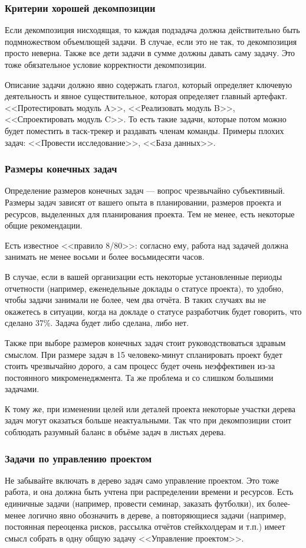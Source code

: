 \documentclass{../../text-style}
\begin{document}
\subsubsection{Критерии хорошей декомпозиции}

Если декомпозиция нисходящая, то каждая подзадача должна действительно быть подмножеством объемлющей задачи. В случае, если это не так, то декомпозиция просто неверна. Также все дети задачи в сумме должны давать саму задачу. Это тоже обязательное условие корректности декомпозиции.

Описание задачи должно явно содержать глагол, который определяет ключевую деятельность и явное существительное, которая определяет главный артефакт. <<Протестировать модуль A>>, <<Реализовать модуль B>>, <<Спроектировать модуль C>>. То есть такие задачи, которые потом можно будет поместить в таск-трекер и раздавать членам команды. Примеры плохих задач: <<Провести исследование>>, <<База данных>>.

\subsubsection{Размеры конечных задач}

Определение размеров конечных задач --- вопрос чрезвычайно субъективный. Размеры задач зависят от вашего опыта в планировании, размеров проекта и ресурсов, выделенных для планирования проекта. Тем не менее, есть некоторые общие рекомендации.

Есть известное <<правило 8/80>>: согласно ему, работа над задачей должна занимать не менее восьми и более восьмидесяти часов.

В случае, если в вашей организации есть некоторые установленные периоды отчетности (например, еженедельные доклады о статусе проекта), то удобно, чтобы задачи занимали не более, чем два отчёта. В таких случаях вы не окажетесь в ситуации, когда на докладе о статусе разработчик будет говорить, что сделано 37\%. Задача будет либо сделана, либо нет.

Также при выборе размеров конечных задач стоит руководствоваться здравым смыслом. При размере задач в 15 человеко-минут спланировать проект будет стоить чрезвычайно дорого, а сам процесс будет очень неэффективен из-за постоянного микроменеджмента. Та же проблема и со слишком большими задачами.

К тому же, при изменении целей или деталей проекта некоторые участки дерева задач могут оказаться больше неактуальными. Так что при декомпозиции стоит соблюдать разумный баланс в объёме задач в листьях дерева.

\subsubsection{Задачи по управлению проектом}

Не забывайте включать в дерево задач само управление проектом. Это тоже работа, и она должна быть учтена при распределении времени и ресурсов. Есть единичные задачи (например, провести семинар, заказать футболки), их более-менее логично явно обозначить в дереве, а повторяющиеся задачи (например, постоянная переоценка рисков, рассылка отчётов стейкхолдерам и т.п.) имеет смысл собрать в одну общую задачу <<Управление проектом>>.
\end{document}
